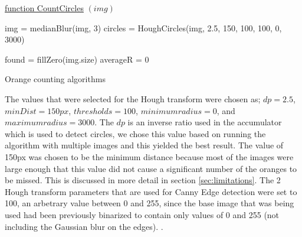 \documentclass[conference]{IEEEtran}
\begin{document}
\begin{algorithm} 

    \underline{function CountCircles} $(img)$\;
    
    img = medianBlur(img, 3)
    circles = HoughCircles(img, 2.5, 150, 100, 100, 0, 3000)
    
    found = fillZero(img.size)
    averageR = 0
    
    \caption{Orange counting algorithms} \label{circleCountAlg}
\end{algorithm}


The values that were selected for the Hough transform were chosen as; $dp = 2.5$, $minDist = 150px$, $thresholds = 100$, $minimum radius = 0$, and  $maximum radius = 3000$. The $dp$ is an inverse ratio used in the accumulator which is used to detect circles, we chose this value based on running the algorithm with multiple images and this yielded the best result. The value of 150px was chosen to be the minimum distance because most of the images were large enough that this value did not cause a significant number of the oranges to be missed. This is discussed in more detail in section \ref{sec:limitations}. The 2 Hough transform parameters that are used for Canny Edge detection were set to 100, an arbetrary value between 0 and 255, since the base image that was being used had been previously binarized to contain only values of 0 and 255 (not including the Gaussian blur on the edges). \cite{yadav_approach_2014}.
\end{document}
